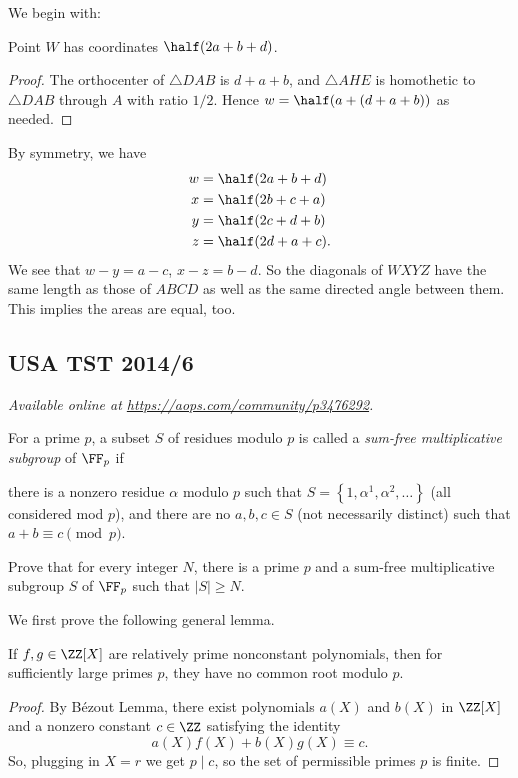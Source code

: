 \documentclass[11pt]{scrartcl}
\begin{document}
We begin with:
\begin{claim*}
  Point $W$ has coordinates $\half(2a+b+d)$.
\end{claim*}
\begin{proof}
  The orthocenter of $\triangle DAB$ is $d+a+b$,
  and $\triangle AHE$ is homothetic to $\triangle DAB$
  through $A$ with ratio $1/2$.
  Hence $w = \half(a+(d+a+b))$ as needed.
\end{proof}

By symmetry, we have
\begin{align*}
  w &= \half(2a+b+d) \\
  x &= \half(2b+c+a) \\
  y &= \half(2c+d+b) \\
  z &= \half(2d+a+c).
\end{align*}
We see that $w-y = a-c$, $x-z = b-d$.
So the diagonals of $WXYZ$ have the same length as those
of $ABCD$ as well as the same directed angle between them.
This implies the areas are equal, too.
\pagebreak

\subsection{USA TST 2014/6}
\textsl{Available online at \url{https://aops.com/community/p3476292}.}
\begin{mdframed}[style=mdpurplebox,frametitle={Problem statement}]
For a prime $p$, a subset $S$ of residues modulo $p$
is called a \emph{sum-free multiplicative subgroup}
of $\FF_p$ if
\begin{itemize}
  \ii there is a nonzero residue $\alpha$ modulo $p$
  such that $S = \left\{ 1, \alpha^1, \alpha^2, \dots \right\}$
  (all considered mod $p$), and
  \ii there are no $a,b,c \in S$
  (not necessarily distinct) such that $a+b \equiv c \pmod p$.
\end{itemize}
Prove that for every integer $N$,
there is a prime $p$ and a sum-free multiplicative subgroup $S$
of $\FF_p$ such that $\left\lvert S \right\rvert \ge N$.
\end{mdframed}
We first prove the following general lemma.

\begin{lemma*}
  If $f,g \in \ZZ[X]$ are relatively prime nonconstant polynomials,
  then for sufficiently large primes $p$,
  they have no common root modulo $p$.
\end{lemma*}
\begin{proof}
  By B\'{e}zout Lemma,
  there exist polynomials $a(X)$ and $b(X)$ in $\ZZ[X]$
  and a nonzero constant $c \in \ZZ$ satisfying the identity
  \[ a(X) f(X) + b(X) g(X) \equiv c. \]
  So, plugging in $X = r$ we get $p \mid c$,
  so the set of permissible primes $p$ is finite.
\end{proof}
\end{document}
